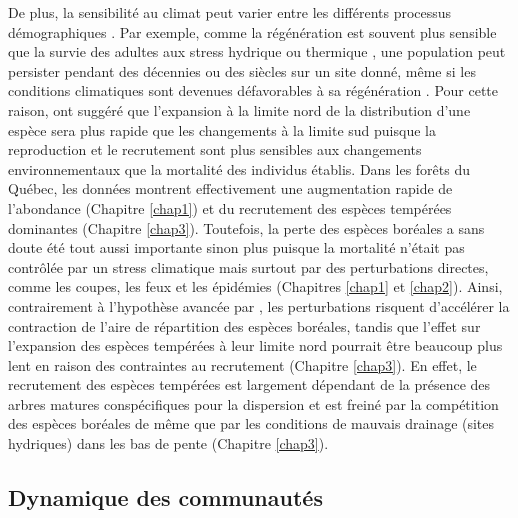 De plus, la sensibilité au climat peut varier entre les différents
processus démographiques \citep{niinemets_responses_2010}. Par exemple,
comme la régénération est souvent plus sensible que la survie des
adultes aux stress hydrique ou thermique
\citep{niinemets_responses_2010}, une population peut persister pendant
des décennies ou des siècles sur un site donné, même si les conditions
climatiques sont devenues défavorables à sa régénération
\citep{talluto_extinction_2017}. Pour cette raison,
\citet{jump_altitude-for-latitude_2009} ont suggéré que l'expansion à la
limite nord de la distribution d'une espèce sera plus rapide que les
changements à la limite sud puisque la reproduction et le recrutement
sont plus sensibles aux changements environnementaux que la mortalité
des individus établis. Dans les forêts du Québec, les données montrent
effectivement une augmentation rapide de l'abondance (Chapitre
\ref{chap1}) et du recrutement des espèces tempérées dominantes
(Chapitre \ref{chap3}). Toutefois, la perte des espèces boréales a sans
doute été tout aussi importante sinon plus puisque la mortalité n'était
pas contrôlée par un stress climatique mais surtout par des
perturbations directes, comme les coupes, les feux et les épidémies
(Chapitres \ref{chap1} et \ref{chap2}). Ainsi, contrairement à
l'hypothèse avancée par \citet{jump_altitude-for-latitude_2009}, les
perturbations risquent d'accélérer la contraction de l'aire de
répartition des espèces boréales, tandis que l'effet sur l'expansion des
espèces tempérées à leur limite nord pourrait être beaucoup plus lent en
raison des contraintes au recrutement (Chapitre \ref{chap3}). En effet,
le recrutement des espèces tempérées est largement dépendant de la
présence des arbres matures conspécifiques pour la dispersion et est
freiné par la compétition des espèces boréales de même que par les
conditions de mauvais drainage (sites hydriques) dans les bas de pente
(Chapitre \ref{chap3}).

\hypertarget{dynamique-des-communautuxe9s}{%
\subsection{Dynamique des
communautés}\label{dynamique-des-communautuxe9s}}

